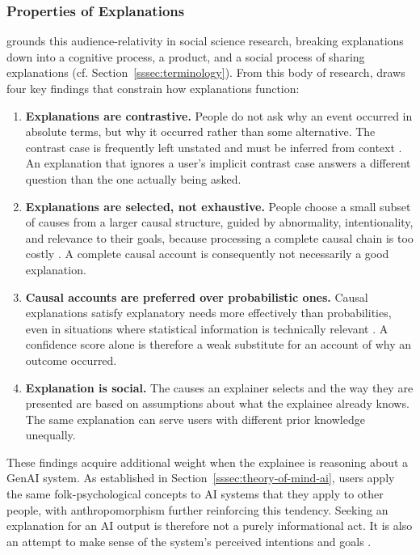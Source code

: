 \subsubsection*{Properties of Explanations}

\textcite{Miller2019} grounds this audience-relativity in social science research, breaking explanations down into a cognitive process, a product, and a social process of sharing explanations (cf. Section~\ref{sssec:terminology}). From this body of research, \textcite{Miller2019} draws four key findings that constrain how explanations function:

\pagebreak

\begin{enumerate}
    \item \textbf{Explanations are contrastive.} People do not ask why an event occurred in absolute terms, but why it occurred rather than some alternative. The contrast case is frequently left unstated and must be inferred from context \parencite{Lipton1990}. An explanation that ignores a user's implicit contrast case answers a different question than the one actually being asked.
    \item \textbf{Explanations are selected, not exhaustive.} People choose a small subset of causes from a larger causal structure, guided by abnormality, intentionality, and relevance to their goals, because processing a complete causal chain is too costly \parencite{Hilton2017}. A complete causal account is consequently not necessarily a good explanation.
    \item \textbf{Causal accounts are preferred over probabilistic ones.} Causal explanations satisfy explanatory needs more effectively than probabilities, even in situations where statistical information is technically relevant \parencite{Lombrozo2007}. A confidence score alone is therefore a weak substitute for an account of why an outcome occurred.
    \item \textbf{Explanation is social.} The causes an explainer selects and the way they are presented are based on assumptions about what the explainee already knows. The same explanation can serve users with different prior knowledge unequally.
\end{enumerate}

These findings acquire additional weight when the explainee is reasoning about a \ac{GenAI} system. As established in Section~\ref{sssec:theory-of-mind-ai}, users apply the same folk-psychological concepts to \ac{AI} systems that they apply to other people, with anthropomorphism further reinforcing this tendency. Seeking an explanation for an \ac{AI} output is therefore not a purely informational act. It is also an attempt to make sense of the system's perceived intentions and goals \parencite{Miller2019}.

